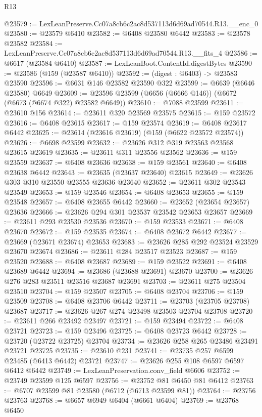 \begin{lexlean}{R13}
\begin{coremodule}
@23579 := LexLeanPreserve.Cc07a8cb6c2ac8d537113d6d69ad70544.R13.__enc_0
@23580 := @23579 @6410
@23582 := @6408 @23580 @6442
@23583 := @23578 @23582
@23584 := LexLeanPreserve.Cc07a8cb6c2ac8d537113d6d69ad70544.R13.__fits_4
@23586 := @6617 (@23584 @6410)
@23587 := LexLeanBoot.ContentId.digestBytes
@23590 := @23586 (@159 (@23587 @6410))
@23592 := (digest : @6403) -> @23583 @23590
@23596 := @6631 @146 @23582 @23590 @322
@23599 := @6639 (@6646 @23580) @6649
@23609 := @23596 @23599 (@6656 (@6666 @146)) (@6672 (@6673 (@6674 @322) @23582 @6649))
@23610 := @7088 @23599
@23611 := @23610 @156
@23614 := @23611 @320 @23569 @23575
@23615 := @159 @23572
@23616 := @6408 @23615
@23617 := @159 @23574
@23619 := @6408 @23617 @6442
@23625 := @23614 (@23616 @23619) (@159 (@6622 @23572 @23574))
@23626 := @6698 @23599
@23632 := @23626 @312 @319 @23563 @23568 @23615 @23619
@23635 := @23611 @311 @23556 @23562
@23636 := @159 @23559
@23637 := @6408 @23636
@23638 := @159 @23561
@23640 := @6408 @23638 @6442
@23643 := @23635 (@23637 @23640) @23615
@23649 := @23626 @303 @310 @23550 @23555 @23636 @23640
@23652 := @23611 @302 @23543 @23549
@23653 := @159 @23546
@23654 := @6408 @23653
@23655 := @159 @23548
@23657 := @6408 @23655 @6442
@23660 := @23652 (@23654 @23657) @23636
@23666 := @23626 @294 @301 @23537 @23542 @23653 @23657
@23669 := @23611 @293 @23530 @23536
@23670 := @159 @23533
@23671 := @6408 @23670
@23672 := @159 @23535
@23674 := @6408 @23672 @6442
@23677 := @23669 (@23671 @23674) @23653
@23683 := @23626 @285 @292 @23524 @23529 @23670 @23674
@23686 := @23611 @284 @23517 @23523
@23687 := @159 @23520
@23688 := @6408 @23687
@23689 := @159 @23522
@23691 := @6408 @23689 @6442
@23694 := @23686 (@23688 @23691) @23670
@23700 := @23626 @276 @283 @23511 @23516 @23687 @23691
@23703 := @23611 @275 @23504 @23510
@23704 := @159 @23507
@23705 := @6408 @23704
@23706 := @159 @23509
@23708 := @6408 @23706 @6442
@23711 := @23703 (@23705 @23708) @23687
@23717 := @23626 @267 @274 @23498 @23503 @23704 @23708
@23720 := @23611 @266 @23492 @23497
@23721 := @159 @23494
@23722 := @6408 @23721
@23723 := @159 @23496
@23725 := @6408 @23723 @6442
@23728 := @23720 (@23722 @23725) @23704
@23734 := @23626 @258 @265 @23486 @23491 @23721 @23725
@23735 := @23610 @231
@23741 := @23735 @257 @6599 @23485 (@6413 @6442) @23721
@23747 := @23626 @255 @108 @6597 @6597 @6412 @6442
@23749 := LexLeanPreservation.conv_field @6606
@23752 := @23749 @23599 @125 @6597
@23756 := @23752 @81 @6450 @81 @6412
@23763 := @6707 @23599 @81 @23580 (@6712 (@6713 @23599 @81))
@23764 := @23756 @23763
@23768 := @6657 @6949 @6404 (@6661 @6404)
@23769 := @23768 @6450

\end{coremodule}
\end{lexlean}
